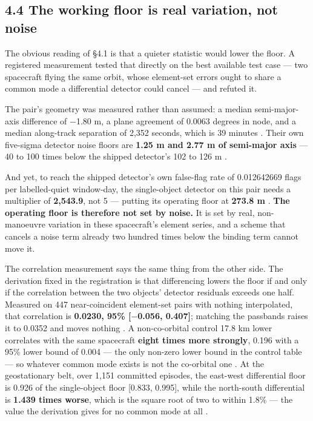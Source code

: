 \documentclass[11pt]{article}
\begin{document}

\subsection*{4.4 The working floor is real variation, not noise}

The obvious reading of \S{}4.1 is that a quieter statistic would lower the floor. A registered measurement tested that directly on the best available test case --- two spacecraft flying the same orbit, whose element-set errors ought to share a common mode a differential detector could cancel --- and refuted it.

The pair's geometry was measured rather than assumed: a median semi-major-axis difference of $-$1.80 m, a plane agreement of 0.0063 degrees in node, and a median along-track separation of 2,352 seconds, which is 39 minutes%
. Their own five-sigma detector noise floors are \textbf{1.25 m and 2.77 m of semi-major axis} --- 40 to 100 times below the shipped detector's 102 to 126 m%
.

And yet, to reach the shipped detector's own false-flag rate of 0.012642669 flags per labelled-quiet window-day, the single-object detector on this pair needs a multiplier of \textbf{2,543.9}, not 5 --- putting its operating floor at \textbf{273.8 m}%
. \textbf{The operating floor is therefore not set by noise.} It is set by real, non-manoeuvre variation in these spacecraft's element series, and a scheme that cancels a noise term already two hundred times below the binding term cannot move it.

The correlation measurement says the same thing from the other side. The derivation fixed in the registration is that differencing lowers the floor if and only if the correlation between the two objects' detector residuals exceeds one half. Measured on 447 near-coincident element-set pairs with nothing interpolated, that correlation is \textbf{0.0230, 95\% [$-$0.056, 0.407]}; matching the passbands raises it to 0.0352 and moves nothing%
. A non-co-orbital control 17.8 km lower correlates with the same spacecraft \textbf{eight times more strongly}, 0.196 with a 95\% lower bound of 0.004 --- the only non-zero lower bound in the control table --- so whatever common mode exists is not the co-orbital one%
. At the geostationary belt, over 1,151 committed episodes, the east-west differential floor is 0.926 of the single-object floor [0.833, 0.995], while the north-south differential is \textbf{1.439 times worse}, which is the square root of two to within 1.8\% --- the value the derivation gives for no common mode at all%
.
\end{document}
